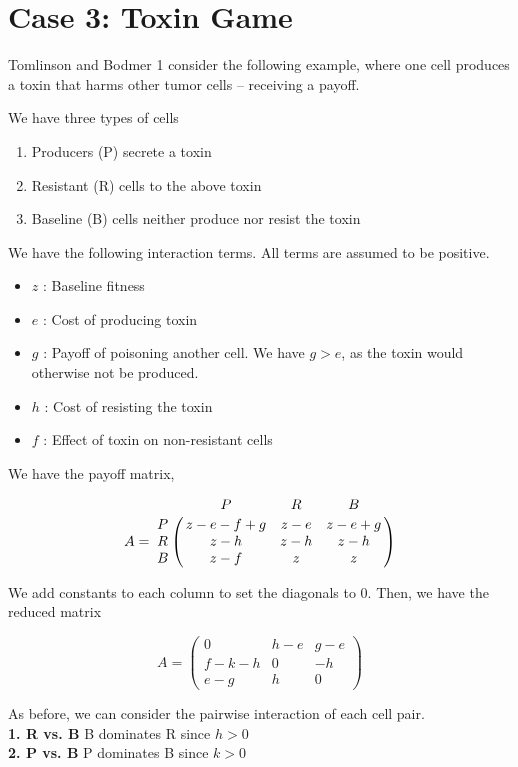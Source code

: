 \documentclass[12pt]{report}
\begin{document}
\section*{Case 3: Toxin Game}
Tomlinson and Bodmer \cite{TomBod}1 consider the following example, where one cell produces a toxin that harms other tumor cells -- receiving a payoff. 

We have three types of cells
\begin{enumerate}
\item Producers (P) secrete a toxin
\item Resistant (R) cells to the above toxin
\item Baseline (B) cells neither produce nor resist the toxin
\end{enumerate}

We have the following interaction terms. All terms are assumed to be positive.
\begin{itemize}
\item $z$ : Baseline fitness
\item $e$ : Cost of producing toxin
\item $g$ :  Payoff of poisoning another cell. We have $g > e$, as the toxin would otherwise not be produced.
\item $h$ :  Cost of resisting the toxin
\item $f$ : Effect of toxin on non-resistant cells
\end{itemize}


We have the payoff matrix, 

$$A = \bordermatrix{\text{}& P & R & B\cr
                P & z - e - f + g & z - e & z - e + g \cr
                R & z - h  &  z - h & z - h \cr
                B & z - f & z & z \cr
               }$$

We add constants to each column to set the diagonals to 0.  Then, we have the reduced matrix


$$ A = \begin{pmatrix}
0 & h - e& g - e \\
f - k - h & 0 & -h \\
e - g& h & 0
\end{pmatrix} $$

As before, we can consider the pairwise interaction of each cell pair. \\

\textbf{1. R vs. B} B dominates R since $h > 0$ \\

\textbf{2. P vs. B} P dominates B since $k > 0$ \\
\end{document}
